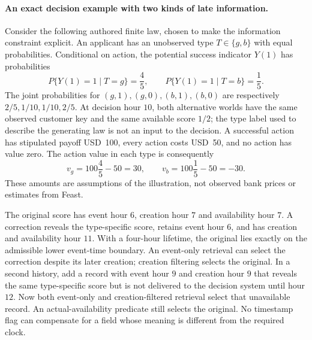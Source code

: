 \paragraph{An exact decision example with two kinds of late information.}
Consider the following authored finite law, chosen to make the information
constraint explicit. An applicant has an unobserved type $T\in\{g,b\}$ with
equal probabilities. Conditional on action, the potential success indicator
$Y(1)$ has probabilities
\begin{equation}
 P\{Y(1)=1\mid T=g\}=\frac45,\qquad
 P\{Y(1)=1\mid T=b\}=\frac15.
 \label{exec19:feast-law}
\end{equation}
The joint probabilities for $(g,1),(g,0),(b,1),(b,0)$ are respectively
$2/5,1/10,1/10,2/5$. At decision hour $10$, both alternative worlds have the
same observed customer key and the same available score $1/2$; the type label
used to describe the generating law is not an input to the decision. A
successful action has stipulated payoff USD~100, every action costs USD~50,
and no action has value zero. The action value in each type is consequently
\begin{equation}
 v_g=100\frac45-50=30,\qquad
 v_b=100\frac15-50=-30.
 \label{exec19:feast-value}
\end{equation}
These amounts are assumptions of the illustration, not observed bank prices
or estimates from Feast.~\citep{exec19_feast_reference}

The original score has event hour $6$, creation hour $7$ and availability hour
$7$. A correction reveals the type-specific score, retains event hour $6$,
and has creation and availability hour $11$. With a four-hour lifetime, the
original lies exactly on the admissible lower event-time boundary. An
event-only retrieval can select the correction despite its later creation;
creation filtering selects the original. In a second history, add a record
with event hour $9$ and creation hour $9$ that reveals the same type-specific
score but is not delivered to the decision system until hour $12$. Now both
event-only and creation-filtered retrieval select that unavailable record.
An actual-availability predicate still selects the original. No timestamp
flag can compensate for a field whose meaning is different from the required
clock.~\citep{exec19_feast_reference}

